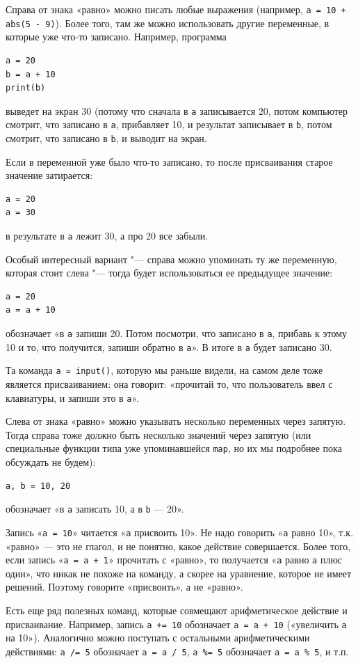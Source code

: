 Справа от знака «равно» можно писать любые выражения (например, \verb`a = 10 + abs(5 - 9)`). 
Более того, там же можно использовать другие переменные, в которые уже что-то записано.
Например, программа
\begin{verbatim}
a = 20
b = a + 10
print(b)
\end{verbatim}
выведет на экран 30 (потому что сначала в \verb`a` записывается 20, потом компьютер смотрит,
что записано в \verb`a`, прибавляет 10, и результат записывает в \verb`b`, потом
смотрит, что записано в \verb`b`, и выводит на экран.

Если в переменной уже было что-то записано, то после присваивания старое значение затирается:
\begin{verbatim}
a = 20
a = 30
\end{verbatim}
в результате в \verb`a` лежит 30, а про 20 все забыли.

Особый интересный вариант "--- справа можно упоминать ту же переменную, которая стоит слева "--- 
тогда будет использоваться ее предыдущее значение:
\begin{verbatim}
a = 20
a = a + 10
\end{verbatim}
обозначает «в \verb`a` запиши 20. Потом посмотри, что записано в \verb`a`, прибавь к этому 10
и то, что получится, запиши обратно в \verb`a`». В итоге в \verb`a` будет записано 30.

Та команда \verb`a = input()`, которую мы раньше видели, на самом деле тоже является присваиванием:
она говорит: «прочитай то, что пользователь ввел с клавиатуры, и запиши это в \verb`a`».

Слева от знака «равно» можно указывать несколько переменных через запятую. Тогда справа
тоже должно быть несколько значений через запятую (или специальные функции типа уже упоминавшейся \verb`map`,
но их мы подробнее пока обсуждать не будем):
\begin{verbatim}
a, b = 10, 20
\end{verbatim}
обозначает «в \verb`a` записать 10, а в \verb`b` — 20».

Запись «\verb`a = 10`» читается «\verb`a` присвоить 10». Не надо говорить «\verb`a` равно 10», 
т.к. «равно» — это не глагол, и не понятно, какое действие совершается. Более того,
если запись «\verb`a = a + 1`» прочитать с «равно», то получается «\verb`a` равно \verb`a` плюс один»,
что никак не похоже на команду, а скорее на уравнение, которое не имеет решений. Поэтому говорите
«присвоить», а не «равно».

Есть еще ряд полезных команд, которые совмещают арифметическое действие и присваивание. Например,
запись \verb`a += 10` обозначает \verb`a = a + 10` («увеличить \verb`a` на 10»). Аналогично можно
поступать с остальными арифметическими действиями: \verb`a /= 5` обозначает \verb`a = a / 5`,
\verb`a %= 5` обозначает \verb`a = a % 5`, и т.п.

